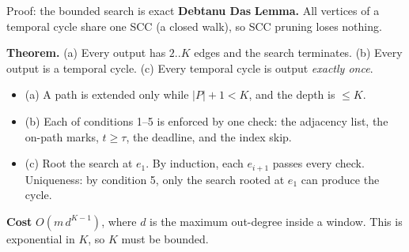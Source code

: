\documentclass[aspectratio=169,11pt]{beamer}
\newcommand{\memberbadge}[1]{%
  \hfill{\small\bfseries\color{memberred}#1}%
}
\begin{document}
\begin{frame}{Proof: the bounded search is exact \memberbadge{Debtanu Das}}
\textbf{Lemma.} All vertices of a temporal cycle share one SCC (a closed walk), so SCC pruning loses nothing.

\vspace{0.25cm}
\textbf{Theorem.} (a) Every output has $2..K$ edges and the search terminates. (b) Every output is a temporal cycle. (c) Every temporal cycle is output \emph{exactly once}.
\begin{itemize}
\setlength{\itemsep}{0.35em}
\item (a) A path is extended only while $|P| + 1 < K$, and the depth is $\le K$.
\item (b) Each of conditions 1--5 is enforced by one check: the adjacency list, the on-path marks, $t \ge \tau$, the deadline, and the index skip.
\item (c) Root the search at $e_1$. By induction, each $e_{i+1}$ passes every check. Uniqueness: by condition 5, only the search rooted at $e_1$ can produce the cycle.
\end{itemize}

\vspace{0.25cm}
\textbf{Cost} $O(m\,d^{K-1})$, where $d$ is the maximum out-degree inside a window. This is exponential in $K$, so $K$ must be bounded.
\end{frame}
\end{document}
